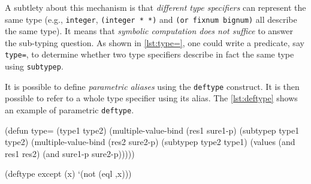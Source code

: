\documentclass[format=sigconf]{acmart}
\newcommand\code[2][\small]{\sloppy\texttt{#1#2}}
\theoremstyle{definition}
\begin{document}
A subtlety about this mechanism is that \emph{different type specifiers} can
represent the same type (e.g., \code{integer}, \code{(integer * *)} and
\code{(or fixnum bignum)} all describe the same type). It means that
\emph{symbolic computation does not suffice} to answer the sub-typing question.
As shown in \vref{lst:type=}, one could write a predicate, say \code{type=}, to
determine whether two type specifiers describe in fact the same type using
\code{subtypep}.

It is possible to define \emph{parametric aliases} using the \code{deftype}
construct. It is then possible to refer to a whole type specifier using its
alias. The \vref{lst:deftype} shows an example of parametric \code{deftype}.

\begin{listing}
\begin{clcode}
(defun type= (type1 type2)
  (multiple-value-bind (res1 sure1-p)
      (subtypep type1 type2)
    (multiple-value-bind (res2 sure2-p)
        (subtypep type2 type1)
      (values (and res1 res2)
              (and sure1-p sure2-p)))))
\end{clcode}
\caption{The predicate \code{type=}}
\label{lst:type=}
\end{listing}

\begin{listing}
\begin{clcode}
(deftype except (x)
  `(not (eql ,x)))
\end{clcode}
\caption{The \code{deftype} construct}
\label{lst:deftype}
\end{listing}
\end{document}
